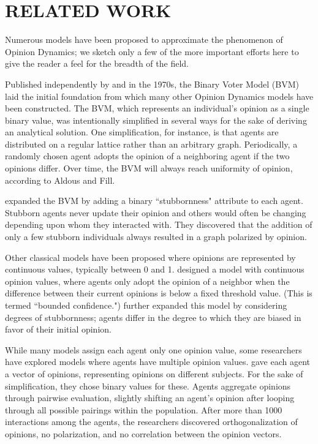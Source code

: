 
\section{RELATED WORK}

Numerous models have been proposed to approximate the phenomenon of Opinion
Dynamics; we sketch only a few of the more important efforts here to give the
reader a feel for the breadth of the field.

Published independently by \cite{clifford_model_1973} and
\cite{holley_ergodic_1975} in the 1970s, the Binary Voter
Model (BVM) laid the initial foundation from which many other Opinion Dynamics
models have been constructed. The BVM, which represents an individual's
opinion as a single binary value, was intentionally simplified in several ways
for the sake of deriving an analytical solution. One simplification,
for instance, is that agents are distributed on a regular lattice rather than
an arbitrary graph. Periodically, a randomly chosen agent adopts the opinion
of a neighboring agent if the two opinions differ. Over time, the BVM will
always reach uniformity of opinion, according to Aldous and Fill.

\cite{yildiz_discrete_2011} expanded the BVM by adding a binary
``stubbornness" attribute to each agent. Stubborn agents never update their
opinion and 
others would often be changing depending upon whom they interacted with. They
discovered that the addition of only a few stubborn individuals always
resulted in a graph polarized by opinion.

Other classical models have been proposed where opinions are represented by
continuous values, typically between 0 and 1. \cite{weisbuch_interacting_2001}
designed a model with continuous opinion values, where agents only adopt the
opinion of a neighbor when the difference between their current opinions is
below a fixed threshold value. (This is termed ``bounded confidence.")
\cite{ghaderi_opinion_2012} further expanded this model by considering degrees
of stubbornness; agents differ in the degree to which they are biased in favor
of their initial opinion.

While many models assign each agent only one opinion value, some researchers
have explored models where agents have multiple opinion values.
\cite{deffuant_mixing_2000} gave each agent a vector of opinions, representing
opinions on different subjects. For the sake of simplification, they chose
binary values for these. Agents aggregate opinions through pairwise
evaluation, 
slightly shifting an agent's opinion after looping through all possible
pairings within the population. After more than 1000 interactions among the
agents, the researchers discovered orthogonalization of opinions, no
polarization, and no correlation between the opinion vectors.

